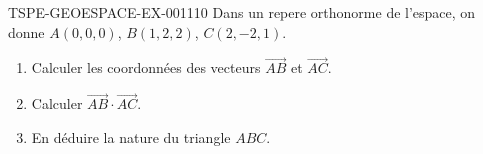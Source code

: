 \begin{exercice}{TSPE-GEOESPACE-EX-001}{1}{10}
Dans un repere orthonorme de l'espace, on donne $A(0,0,0)$, $B(1,2,2)$, $C(2,-2,1)$.
\begin{enumerate}
  \item Calculer les coordonnées des vecteurs $\vec{AB}$ et $\vec{AC}$.
  \item Calculer $\vec{AB}\cdot\vec{AC}$.
  \item En déduire la nature du triangle $ABC$.
\end{enumerate}
\end{exercice}
